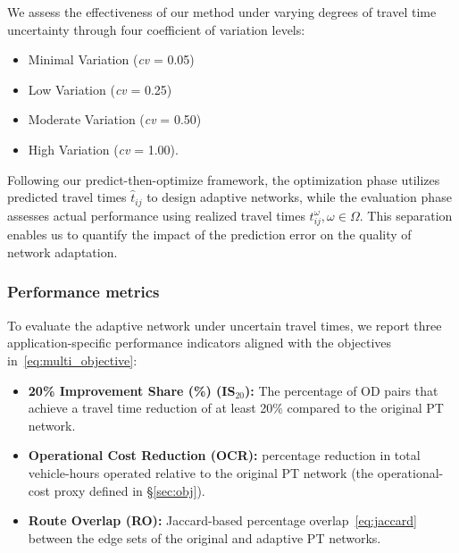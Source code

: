 \documentclass[a4paper,fleqn]{cas-sc}
\begin{document}
We assess the effectiveness of our method under varying degrees of travel time uncertainty through four coefficient of variation levels: 
\begin{itemize}
    \item Minimal Variation (\textit{cv} = 0.05)
    \item Low Variation (\textit{cv} = 0.25)
    \item Moderate Variation (\textit{cv} = 0.50)
    \item High Variation (\textit{cv} = 1.00).
\end{itemize}
%
Following our predict-then-optimize framework, the optimization phase utilizes predicted travel times $\hat{t}_{ij}$ to design adaptive networks, while the evaluation phase assesses actual performance using realized travel times $t_{ij}^\omega,\omega\in\Omega$. This separation enables us to quantify the impact of the prediction error on the quality of network adaptation.

\subsubsection{Performance metrics}\label{sec:performMETRICS}

To evaluate the adaptive network under uncertain travel times, we report three
application-specific performance indicators aligned with the objectives
in~\eqref{eq:multi_objective}:

\begin{itemize}
    \item \textbf{20\% Improvement Share (\%) (IS$_{20}$):} The percentage of OD pairs that achieve a travel time reduction of at least 20\% compared to the original PT network.
    \item \textbf{Operational Cost Reduction (OCR):} percentage reduction in
    total vehicle-hours operated relative to the original PT network (the operational-cost proxy defined in \S\ref{sec:obj}).
    \item \textbf{Route Overlap (RO):} Jaccard-based percentage overlap~\eqref{eq:jaccard} between the edge sets of the original and adaptive PT networks.
\end{itemize}
\end{document}
